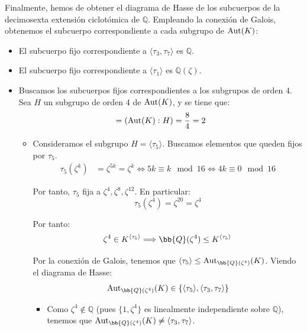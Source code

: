 \begin{ejemplo}
    Finalmente, hemos de obtener el diagrama de Hasse de los subcuerpos de la decimosexta extensión ciclotómica de $\mathbb{Q}$. Empleando la conexión de Galois, obtenemos el subcuerpo correspondiente a cada subgrupo de $\operatorname{Aut}(K)$:
    \begin{itemize}
        \item El subcuerpo fijo correspondiente a $\langle \tau_3, \tau_7\rangle$ es $\mathbb{Q}$.
        \item El subcuerpo fijo correspondiente a $\langle \tau_1\rangle$ es $\mathbb{Q}(\zeta)$.
        \item Buscamos los subcuerpos fijos correspondientes a los subgrupos de orden $4$. Sea $H$ un subgrupo de orden $4$ de $\operatorname{Aut}(K)$, y se tiene que:
        \begin{equation*}
            [K^H:\mathbb{Q}] = (\Aut(K):H) = \frac{8}{4} = 2
        \end{equation*}
        \begin{itemize}
            \item Consideramos el subgrupo $H = \langle \tau_5\rangle$. Buscamos elementos que queden fijos por $\tau_5$.
            \begin{align*}
                \tau_5(\zeta^k) &= \zeta^{5k} = \zeta^k \iff 5k \equiv k \mod 16 \iff 4k \equiv 0 \mod 16
            \end{align*}

            Por tanto, $\tau_5$ fija a $\zeta^4, \zeta^8, \zeta^{12}$. En particular:
            \begin{equation*}
                \tau_5(\zeta^4)=\zeta^{20} = \zeta^4
            \end{equation*}

            Por tanto:
            \begin{equation*}
                \zeta^4\in K^{\langle \tau_5\rangle}
                \Longrightarrow \bb{Q}(\zeta^4)\leq K^{\langle \tau_5\rangle}
            \end{equation*}

            Por la conexión de Galois, tenemos que $\langle \tau_5\rangle\leq \Aut_{\bb{Q}(\zeta^4)}(K)$. Viendo el diagrama de Hasse:
            \begin{equation*}
                \Aut_{\bb{Q}(\zeta^4)}(K) \in \{\langle \tau_5\rangle, \langle \tau_3, \tau_7\rangle\}
            \end{equation*}
            \begin{itemize}
                \item Como $\zeta^4\notin \mathbb{Q}$ (pues $\{1,\zeta^4\}$ es linealmente independiente sobre $\mathbb{Q}$), tenemos que $\Aut_{\bb{Q}(\zeta^4)}(K)\neq \langle \tau_3, \tau_7\rangle$.
            \end{itemize}


\end{itemize}
\end{itemize}
\end{ejemplo}
